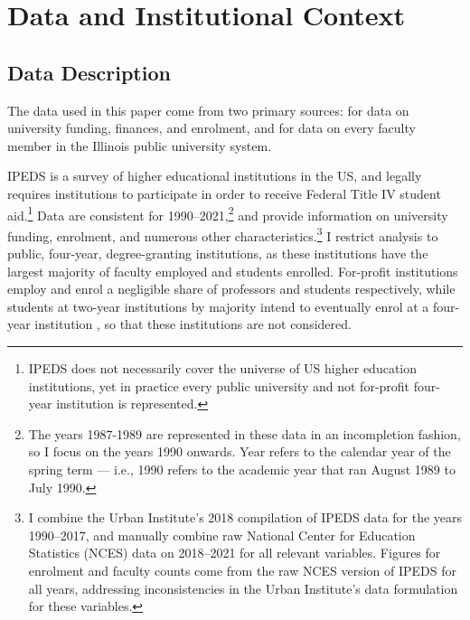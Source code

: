 \section{Data and Institutional Context}
\label{sec:data}

\subsection{Data Description}
The data used in this paper come from two primary sources: \citet[IPEDS]{ipeds} for data on university funding, finances, and enrolment, and \citet[IBHED]{ibhed} for data on every faculty member in the Illinois public university system.

IPEDS is a survey of higher educational institutions in the US, and legally requires institutions to participate in order to receive Federal Title IV student aid.\footnote{
    IPEDS does not necessarily cover the universe of US higher education institutions, yet in practice every public university and not for-profit four-year institution is represented.
}
Data are consistent for 1990--2021,\footnote{
    The years 1987-1989 are represented in these data in an incompletion fashion, so I focus on the years 1990 onwards.
    Year refers to the calendar year of the spring term --- i.e., 1990 refers to the academic year that ran August 1989 to July 1990.
}
and provide information on university funding, enrolment, and numerous other characteristics.\footnote{
    I combine the Urban Institute's 2018 compilation of IPEDS data for the years 1990--2017, and manually combine raw National Center for Education Statistics (NCES) data on 2018--2021 for all relevant variables.
    Figures for enrolment and faculty counts come from the raw NCES version of IPEDS for all years, addressing inconsistencies in the Urban Institute's data formulation for these variables.
}
I restrict analysis to public, four-year, degree-granting institutions, as these institutions have the largest majority of faculty employed and students enrolled.
For-profit institutions employ and enrol a negligible share of professors and students respectively, while students at two-year institutions by majority intend to eventually enrol at a four-year institution \citep{mountjoy2022}, so that these institutions are not considered.

